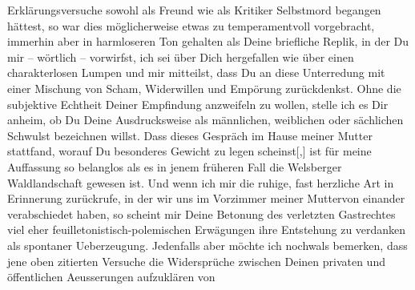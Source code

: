 \begin{ledgroupsized}[t]{13cm}
               Erklärungsversuche sowohl als Freund wie als Kritiker Selbstmord begangen hättest, so
               war dies möglicherweise  etwas zu temperamentvoll
               vorgebracht, immerhin aber in harmloseren Ton gehalten als Deine briefliche Replik,
               in der Du mir – wörtlich – vorwirfst, ich sei über Dich hergefallen wie über einen
               charakterlosen Lumpen und mir mitteilst, dass Du an diese Unterredung mit einer
               Mischung von Scham, Widerwillen und Empörung zurückdenkst. Ohne die subjektive
               Echtheit Deiner Empfindung anzweifeln zu wollen, stelle ich es Dir anheim, ob Du
               Deine Ausdrucksweise als männlichen, weiblichen oder sächlichen Schwulst bezeichnen
               willst.\pend
           \pstart
           {\pb}Dass dieses Gespräch im Hause meiner Mutter stattfand, worauf Du besonderes
               Gewicht zu legen scheinst{[},{]} ist für meine Auffassung so belanglos
               als es in jenem früheren Fall die Welsberger
               Waldlandschaft gewesen ist. Und wenn ich mir die ruhige, fast herzliche Art in
               Erinnerung zurückrufe, in der wir uns im Vorzimmer meiner Mutter\introOben{}von einander\introOben{} verabschiedet haben, so scheint mir Deine
               Betonung des verletzten Gastrechtes viel eher feuilletoni\introOben{}sti\introOben{}sch-polemischen Erwägungen ihre Entstehung zu verdanken als spontaner
               Ueberzeugung. Jedenfalls aber möchte ich nochwals bemerken, dass jene oben zitierten
               Versuche die Widersprüche zwischen Deinen privaten und öffentlichen Aeusserungen aufzuklären von

\end{ledgroupsized}
